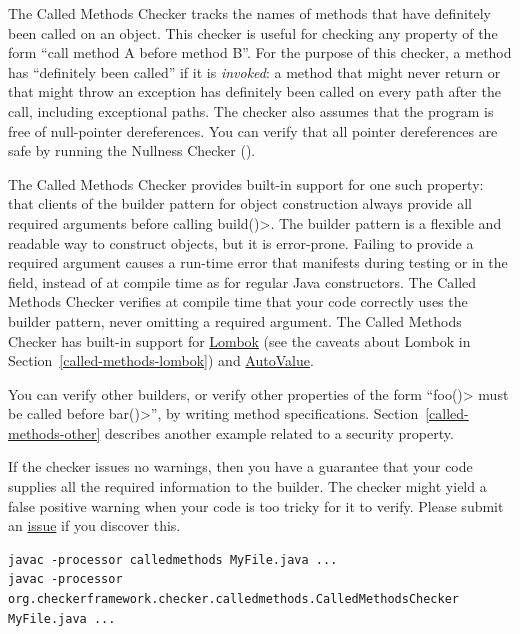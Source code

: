 
The Called Methods Checker tracks the names of methods that have definitely
been called on an object. This checker is useful for checking any property
of the form ``call method A before method B''. For the purpose of this
checker, a method has ``definitely been called'' if it is \emph{invoked}:
a method that might never return or that might throw an exception has
definitely been called on every path after the call, including exceptional paths.
The checker also assumes that the program is free of null-pointer dereferences.
You can verify that all pointer dereferences are safe
by running the Nullness Checker ().

The Called Methods Checker provides built-in support for one such property:
that clients of the builder pattern for object
construction always provide all required arguments before calling
\<build()>.  The builder pattern is a flexible and readable way to
construct objects, but it is error-prone.  Failing to provide
a required argument causes a run-time error that manifests during testing
or in the field, instead of at compile time as for regular Java
constructors.  The Called Methods Checker verifies at compile time that
your code correctly uses the builder pattern, never omitting a required
argument. The Called Methods Checker has built-in support for
\href{https://projectlombok.org/}{Lombok} (see the caveats about Lombok in
Section~\ref{called-methods-lombok}) and
\href{https://github.com/google/auto/blob/master/value/userguide/index.md}{AutoValue}.

You can verify other builders, or verify other properties of the form
``\<foo()> must be called before \<bar()>'', by writing method specifications.
Section~\ref{called-methods-other} describes another example related to a
security property.

If the checker issues no warnings, then you have a guarantee that your code
supplies all the required information to the builder.  The checker might
yield a false positive warning when your code is too tricky for it to
verify.  Please submit an
\href{https://github.com/typetools/checker-framework/issues}{issue} if you
discover this.



\begin{Verbatim}
javac -processor calledmethods MyFile.java ...
javac -processor org.checkerframework.checker.calledmethods.CalledMethodsChecker MyFile.java ...
\end{Verbatim}

